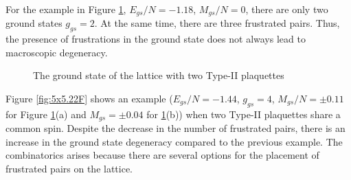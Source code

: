 \documentclass[utf8, babel, sor, jor, amsmath, amssymb, reprint]{elsarticle} %
\begin{document}
For the example in Figure \ref{fig:4x7}, $E_{gs}/N=-1.18$, $M_{gs}/N=0$, there are only two ground states $g_{gs}=2$. At the same time, there are three frustrated pairs. Thus, the presence of frustrations in the ground state does not always lead to macroscopic degeneracy. 

\begin{figure}[H]
	\centering
	\caption{The ground state of the lattice with two Type-II plaquettes}
	\label{fig:4x7}
\end{figure}

Figure \ref{fig:5x5.22F} shows an example ($E_{gs}/N=-1.44$, $g_{gs}=4$, $M_{gs}/N=\pm 0.11$ for Figure \ref{fig:4x7}(a) and $M_{gs}=\pm 0.04$ for \ref{fig:4x7}(b)) when two Type-II plaquettes share a common spin. Despite the decrease in the number of frustrated pairs, there is an increase in the ground state degeneracy compared to the previous example. The combinatorics arises because there are several options for the placement of frustrated pairs on the lattice.
\end{document}
